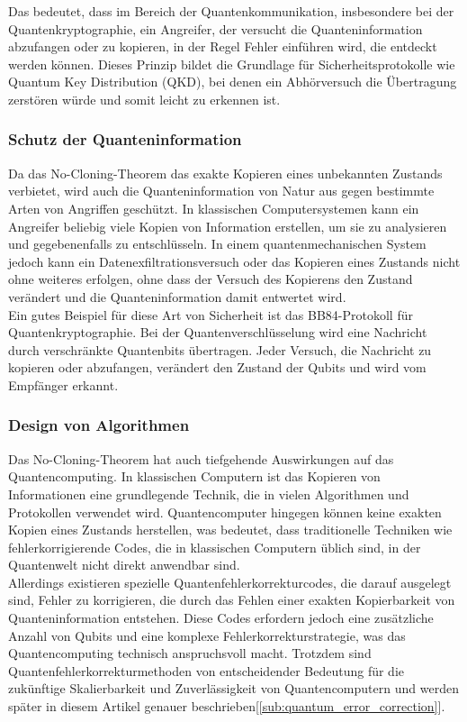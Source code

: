 Das bedeutet, dass im Bereich der Quantenkommunikation, insbesondere bei der Quantenkryptographie, ein Angreifer,
der versucht die Quanteninformation abzufangen oder zu kopieren, in der Regel Fehler einführen wird, die entdeckt werden können.
Dieses Prinzip bildet die Grundlage für Sicherheitsprotokolle wie Quantum Key Distribution (QKD),
bei denen ein Abhörversuch die Übertragung zerstören würde und somit leicht zu erkennen ist.

\subsubsection{Schutz der Quanteninformation}
Da das No-Cloning-Theorem das exakte Kopieren eines unbekannten Zustands verbietet,
wird auch die Quanteninformation von Natur aus gegen bestimmte Arten von Angriffen geschützt.
In klassischen Computersystemen kann ein Angreifer beliebig viele Kopien von Information erstellen,
um sie zu analysieren und gegebenenfalls zu entschlüsseln.
In einem quantenmechanischen System jedoch kann ein Datenexfiltrationsversuch oder das Kopieren eines Zustands
nicht ohne weiteres erfolgen, ohne dass der Versuch des Kopierens den Zustand verändert
und die Quanteninformation damit entwertet wird.\\

Ein gutes Beispiel für diese Art von Sicherheit ist das BB84-Protokoll für Quantenkryptographie.
Bei der Quantenverschlüsselung wird eine Nachricht durch verschränkte Quantenbits übertragen.
Jeder Versuch, die Nachricht zu kopieren oder abzufangen, verändert den Zustand der Qubits und wird vom Empfänger erkannt.

\subsubsection{Design von Algorithmen}

Das No-Cloning-Theorem hat auch tiefgehende Auswirkungen auf das Quantencomputing.
In klassischen Computern ist das Kopieren von Informationen eine grundlegende Technik, die in vielen Algorithmen und Protokollen verwendet wird.
Quantencomputer hingegen können keine exakten Kopien eines Zustands herstellen, was bedeutet,
dass traditionelle Techniken wie fehlerkorrigierende Codes, die in klassischen Computern üblich sind, in der Quantenwelt nicht direkt anwendbar sind.\\

Allerdings existieren spezielle Quantenfehlerkorrekturcodes, die darauf ausgelegt sind, Fehler zu korrigieren,
die durch das Fehlen einer exakten Kopierbarkeit von Quanteninformation entstehen.
Diese Codes erfordern jedoch eine zusätzliche Anzahl von Qubits und eine komplexe Fehlerkorrekturstrategie,
was das Quantencomputing technisch anspruchsvoll macht.
Trotzdem sind Quantenfehlerkorrekturmethoden von entscheidender Bedeutung für die zukünftige Skalierbarkeit
und Zuverlässigkeit von Quantencomputern und werden später in diesem Artikel genauer beschrieben[\ref{sub:quantum_error_correction}].

